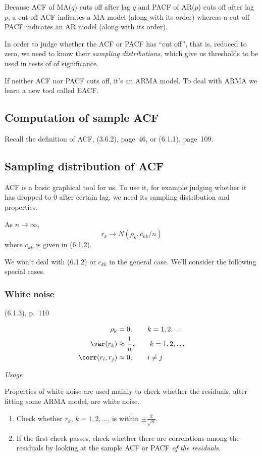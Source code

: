 \documentclass[12pt]{article}
\begin{document}
Because ACF of MA($q$) cuts off after lag $q$
and PACF of AR($p$) cuts off after lag $p$,
a cut-off ACF indicates a MA model (along with its order)
whereas a cut-off PACF indicates an AR model (along with its order).

In order to judge whether the ACF or PACF has ``cut off'',
that is, reduced to zero, we need to know their \emph{sampling
distributions}, which give us thresholds to be used in tests of of
significance.

If neither ACF nor PACF cuts off,
it's an ARMA model.
To deal with ARMA we learn a new tool called EACF.


\subsection{Computation of sample ACF}

Recall the definition of ACF, (3.6.2), page~46, or (6.1.1), page~109.

\subsection{Sampling distribution of ACF}

ACF is a basic graphical tool for us.
To use it, for example judging whether it has dropped to 0 after certain
lag, we need its sampling distribution and properties.

\theorem
As $n\to \infty$,
\[
r_k \to N(\rho_k, c_{kk}/n)
\]
where $c_{kk}$ is given in (6.1.2).

We won't deal with (6.1.2) or $c_{kk}$ in the general case.
We'll consider the following special cases.

\subsubsection{White noise}

(6.1.3), p.~110

\begin{align*}
\rho_k &= 0,                    \qquad k=1,2,\dotsc\\
\var(r_k) &\approx \frac{1}{n}, \qquad k=1,2,\dotsc\\
\corr(r_i, r_j) &\approx 0,     \qquad i \ne j
\end{align*}

\emph{Usage}

Properties of white noise are used mainly to check whether
the residuals, after fitting some ARMA model,
are white noise.
\begin{enumerate}
\item Check whether $r_k$, $k=1,2,\dotsc$, is within
    $\pm \frac{2}{\sqrt{n}}$.
\item If the first check passes, check whether there are correlations
    among the residuals by looking at the sample ACF or PACF
    \emph{of the residuals}.
\end{enumerate}
\end{document}

